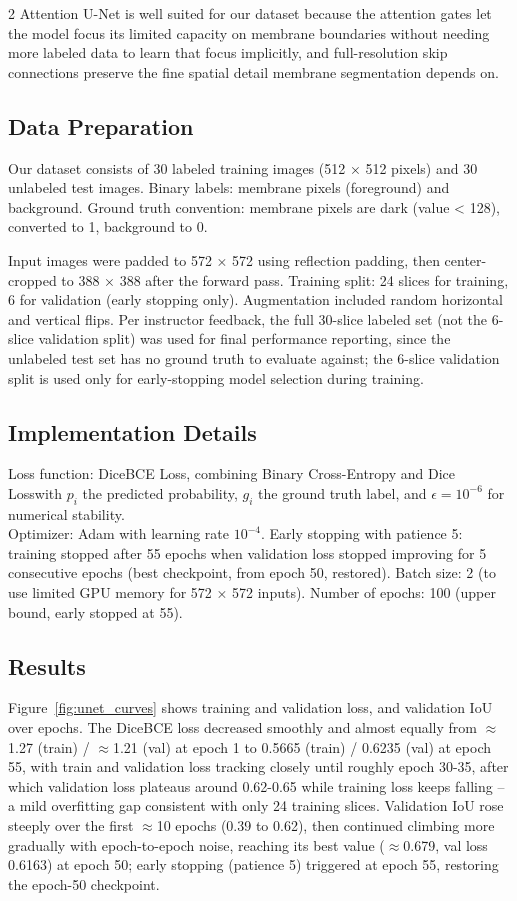﻿\documentclass[a4paper,10pt]{article}
\begin{document}
\begin{multicols*}{2}
Attention U-Net is well suited for our dataset because the attention gates let the model focus its limited capacity on membrane boundaries without needing more labeled data to learn that focus implicitly, and full-resolution skip connections preserve the fine spatial detail membrane segmentation depends on.

\subsection{Data Preparation}
Our dataset consists of 30 labeled training images (512 × 512 pixels) and 30 unlabeled test images. Binary labels: membrane pixels (foreground) and background. Ground truth convention: membrane pixels are dark (value < 128), converted to 1, background to 0.

Input images were padded to 572 × 572 using reflection padding, then center-cropped to 388 × 388 after the forward pass. Training split: 24 slices for training, 6 for validation (early stopping only). Augmentation included random horizontal and vertical flips. Per instructor feedback, the full 30-slice labeled set (not the 6-slice validation split) was used for final performance reporting, since the unlabeled test set has no ground truth to evaluate against; the 6-slice validation split is used only for early-stopping model selection during training.

\subsection{Implementation Details}
Loss function: DiceBCE Loss, combining Binary Cross-Entropy and Dice Losswith \(p_i\) the predicted probability, \(g_i\) the ground truth label, and \(\epsilon = 10^{-6}\) for numerical stability.\\

Optimizer: Adam with learning rate \(10^{-4}\). Early stopping with patience 5: training stopped after 55 epochs when validation loss stopped improving for 5 consecutive epochs (best checkpoint, from epoch 50, restored). Batch size: 2 (to use limited GPU memory for 572 × 572 inputs). Number of epochs: 100 (upper bound, early stopped at 55).

\subsection{Results}
Figure~\ref{fig:unet_curves} shows training and validation loss, and validation IoU over epochs. The DiceBCE loss decreased smoothly and almost equally from $\approx$1.27 (train) / $\approx$1.21 (val) at epoch 1 to 0.5665 (train) / 0.6235 (val) at epoch 55, with train and validation loss tracking closely until roughly epoch 30-35, after which validation loss plateaus around 0.62-0.65 while training loss keeps falling -- a mild overfitting gap consistent with only 24 training slices. Validation IoU rose steeply over the first $\approx$10 epochs (0.39 to 0.62), then continued climbing more gradually with epoch-to-epoch noise, reaching its best value ($\approx$0.679, val loss 0.6163) at epoch 50; early stopping (patience 5) triggered at epoch 55, restoring the epoch-50 checkpoint.


\end{multicols*}
\end{document}
